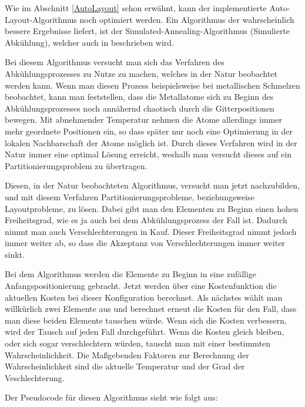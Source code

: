 Wie im Abschnitt \ref{AutoLayout} schon erwähnt, kann der implementierte
Auto-Layout-Algorithmus noch optimiert werden. Ein Algorithmus der
wahrscheinlich bessere Ergebnisse liefert, ist der Simulated-Annealing-Algorithmus (Simulierte
Ab\-kühlung), welcher auch in \cite{Layout} beschrieben wird.\vspace{10pt}

Bei diesem Algorithmus versucht man sich das Verfahren des Ab\-kühlungs\-pro\-zes\-ses zu
Nutze zu machen, welches in der Natur beobachtet werden kann. Wenn man diesen
Prozess beispielsweise bei metallischen Schmelzen beobachtet, kann man
feststellen, dass die Metallatome sich zu Beginn des Ab\-kühlungs\-pro\-zes\-ses noch
annähernd chaotisch durch die Gitterpositionen bewegen. Mit abnehmender
Temperatur nehmen die Atome allerdings immer mehr geordnete Positionen ein, so
dass später nur noch eine Optimierung in der lokalen Nachbarschaft der Atome
möglich ist. Durch dieses Verfahren wird in der Natur immer eine
optimal Lösung erreicht, weshalb man versucht dieses auf ein
Partitionierungsproblem zu übertragen.\vspace{10pt}

Diesen, in der Natur beobachteten Algorithmus, versucht man jetzt nachzubilden,
und mit diesem Verfahren Partitionierungsprobleme, beziehungsweise
Layoutprobleme, zu lösen. Dabei gibt man den Elementen zu Beginn einen hohen
Freiheitsgrad, wie es ja auch bei dem Abkühlungsprozess der Fall ist. Dadurch
nimmt man auch Verschlechterungen in Kauf. Dieser Freiheitsgrad nimmt jedoch
immer weiter ab, so dass die Akzeptanz von Verschlechterungen immer weiter
sinkt.\vspace{10pt}

Bei dem Algorithmus werden die Elemente zu Beginn in eine zufällige
Anfangspositionierung gebracht. Jetzt werden über eine Kostenfunktion die
aktuellen Kosten bei dieser Konfiguration berechnet. Als nächstes wählt man
willkürlich zwei Elemente aus und berechnet erneut die Kosten für den Fall,
dass man diese beiden Elemente tauschen würde. Wenn sich die Kosten verbessern,
wird der Tausch auf jeden Fall durchgeführt. Wenn die Kosten gleich bleiben,
oder sich sogar verschlechtern würden, tauscht man mit einer bestimmten
Wahr\-schein\-lich\-keit. Die Maßgebenden Faktoren zur Berechnung der
Wahr\-schein\-lich\-keit sind die aktuelle Temperatur und der Grad der
Veschlechterung.\vspace{10pt}

\newpage
Der Pseudocode für diesen Algorithmus sieht wie folgt aus:\vspace{10pt}

